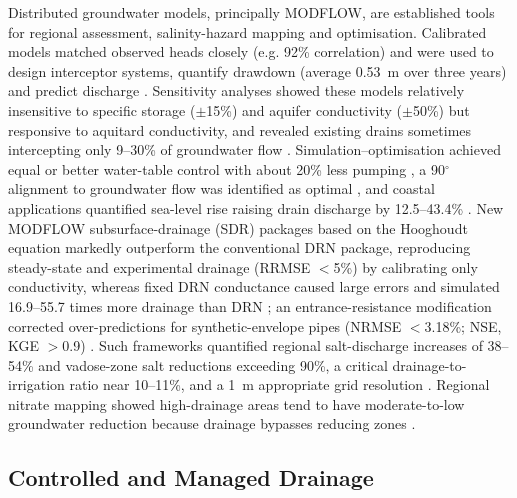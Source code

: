 \documentclass[11pt]{article}
\begin{document}
Distributed groundwater models, principally MODFLOW, are established tools for regional assessment, salinity-hazard mapping and optimisation. Calibrated models matched observed heads closely (e.g. 92\% correlation) and were used to design interceptor systems, quantify drawdown (average 0.53~m over three years) and predict discharge \parencite{Ghorbani2016,Mirlas2012,Mirlas2009,Mirlas2013,Mirlas2021,AbdElaziz2025}. Sensitivity analyses showed these models relatively insensitive to specific storage ($\pm$15\%) and aquifer conductivity ($\pm$50\%) but responsive to aquitard conductivity, and revealed existing drains sometimes intercepting only 9--30\% of groundwater flow \parencite{Mirlas2012,Mirlas2009,Mirlas2013}. Simulation--optimisation achieved equal or better water-table control with about 20\% less pumping \parencite{Rana2008}, a 90$^{\circ}$ alignment to groundwater flow was identified as optimal \parencite{AbdElaziz2025}, and coastal applications quantified sea-level rise raising drain discharge by 12.5--43.4\% \parencite{AbdElaty2019}. New MODFLOW subsurface-drainage (SDR) packages based on the Hooghoudt equation markedly outperform the conventional DRN package, reproducing steady-state and experimental drainage (RRMSE $<$5\%) by calibrating only conductivity, whereas fixed DRN conductance caused large errors and simulated 16.9--55.7 times more drainage than DRN \parencite{Yang2022b,Han2025}; an entrance-resistance modification corrected over-predictions for synthetic-envelope pipes (NRMSE $<$3.18\%; NSE, KGE $>$0.9) \parencite{Qian2025b}. Such frameworks quantified regional salt-discharge increases of 38--54\% and vadose-zone salt reductions exceeding 90\%, a critical drainage-to-irrigation ratio near 10--11\%, and a 1~m appropriate grid resolution \parencite{Yang2022b,Han2025}. Regional nitrate mapping showed high-drainage areas tend to have moderate-to-low groundwater reduction because drainage bypasses reducing zones \parencite{Hojberg2017,Hansen2019}.

\subsection{Controlled and Managed Drainage}
\end{document}
